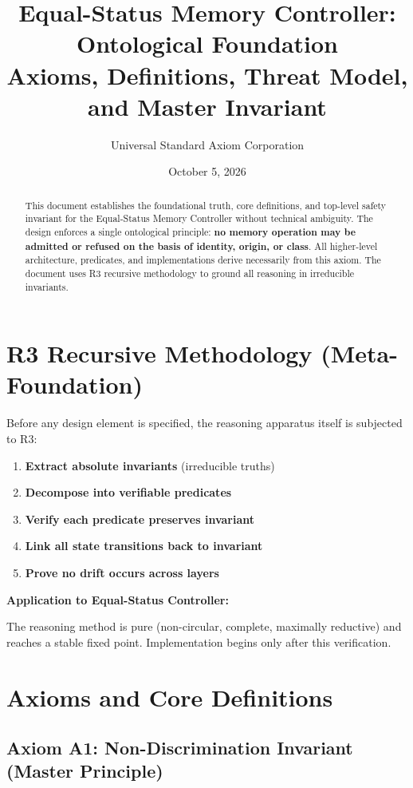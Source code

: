 \documentclass[11pt,oneside]{article}
\title{Equal-Status Memory Controller: Ontological Foundation\\
\large Axioms, Definitions, Threat Model, and Master Invariant}
\author{Universal Standard Axiom Corporation}
\date{October 5, 2026}
\begin{document}
\maketitle

\begin{abstract}
This document establishes the foundational truth, core definitions, and top-level safety invariant for the Equal-Status Memory Controller without technical ambiguity. The design enforces a single ontological principle: \textbf{no memory operation may be admitted or refused on the basis of identity, origin, or class}. All higher-level architecture, predicates, and implementations derive necessarily from this axiom. The document uses R3 recursive methodology to ground all reasoning in irreducible invariants.
\end{abstract}

\tableofcontents
\newpage

\section{R3 Recursive Methodology (Meta-Foundation)}

Before any design element is specified, the reasoning apparatus itself is subjected to R3:

\begin{enumerate}
\item \textbf{Extract absolute invariants} (irreducible truths)
\item \textbf{Decompose into verifiable predicates}
\item \textbf{Verify each predicate preserves invariant}
\item \textbf{Link all state transitions back to invariant}
\item \textbf{Prove no drift occurs across layers}
\end{enumerate}

\textbf{Application to Equal-Status Controller:}

The reasoning method is pure (non-circular, complete, maximally reductive) and reaches a stable fixed point. Implementation begins only after this verification.

\section{Axioms and Core Definitions}

\subsection{Axiom A1: Non-Discrimination Invariant (Master Principle)}
\end{document}
